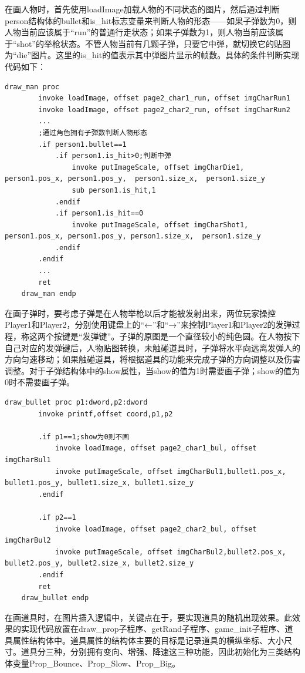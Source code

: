 \par
在画人物时，首先使用loadImage加载人物的不同状态的图片，然后通过判断person结构体的bullet和is\_hit标志变量来判断人物的形态——如果子弹数为0，则人物当前应该属于“run”的普通行走状态；如果子弹数为1，则人物当前应该属于“shot”的举枪状态。不管人物当前有几颗子弹，只要它中弹，就切换它的贴图为“die”图片。这里的is\_hit的值表示其中弹图片显示的帧数。具体的条件判断实现代码如下：
\begin{lstlisting}[language={[x86masm]Assembler}]
    draw_man proc	
        invoke loadImage, offset page2_char1_run, offset imgCharRun1
        invoke loadImage, offset page2_char2_run, offset imgCharRun2
        ...
        ;通过角色拥有子弹数判断人物形态
        .if person1.bullet==1
            .if person1.is_hit>0;判断中弹
                invoke putImageScale, offset imgCharDie1, person1.pos_x, person1.pos_y,  person1.size_x,  person1.size_y
                sub person1.is_hit,1
            .endif
            .if person1.is_hit==0
                invoke putImageScale, offset imgCharShot1, person1.pos_x, person1.pos_y, person1.size_x,  person1.size_y
            .endif
        .endif
        ...
        ret
    draw_man endp
\end{lstlisting}
\par
在画子弹时，要考虑子弹是在人物举枪以后才能被发射出来，两位玩家操控Player1和Player2，分别使用键盘上的“←”和“→”来控制Player1和Player2的发弹过程，称这两个按键是“发弹键”。子弹的原图是一个直径较小的纯色圆。在人物按下自己对应的发弹键后，人物贴图转换，未触碰道具时，子弹将水平向远离发弹人的方向匀速移动；如果触碰道具，将根据道具的功能来完成子弹的方向调整以及伤害调整。对于子弹结构体中的show属性，当show的值为1时需要画子弹；show的值为0时不需要画子弹。
\begin{lstlisting}[language={[x86masm]Assembler}]
    draw_bullet proc p1:dword,p2:dword
        invoke printf,offset coord,p1,p2
        
        .if p1==1;show为0则不画
            invoke loadImage, offset page2_char1_bul, offset imgCharBul1
            invoke putImageScale, offset imgCharBul1,bullet1.pos_x, bullet1.pos_y, bullet1.size_x, bullet1.size_y
        .endif

        .if p2==1				
            invoke loadImage, offset page2_char2_bul, offset imgCharBul2
            invoke putImageScale, offset imgCharBul2,bullet2.pos_x, bullet2.pos_y, bullet2.size_x, bullet2.size_y			
        .endif
        ret
    draw_bullet endp
\end{lstlisting}
\par
在画道具时，在图片插入逻辑中，关键点在于，要实现道具的随机出现效果。此效果的实现代码放置在draw\_prop子程序、getRand子程序、game\_init子程序、道具属性结构体中。道具属性的结构体主要的目标是记录道具的横纵坐标、大小尺寸。道具分三种，分别拥有变向、增强、降速这三种功能，因此初始化为三类结构体变量Prop\_Bounce、Prop\_Slow、Prop\_Big。
